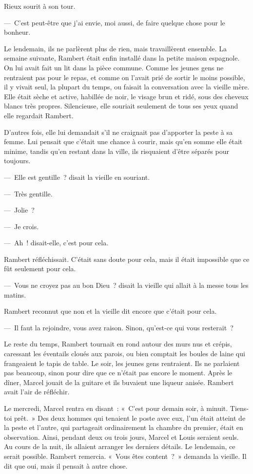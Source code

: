 \documentclass[french,twoside]{book} %
\begin{document}
Rieux sourit à son tour.\par
— C’est peut-être que j’ai envie, moi aussi, de faire quelque chose pour le bonheur.\par
Le lendemain, ils ne parlèrent plus de rien, mais travaillèrent ensemble. La semaine suivante, Rambert était enfin installé dans la petite maison espagnole. On lui avait fait un lit dans la pièce commune. Comme les jeunes gens ne rentraient pas pour le repas, et comme on l’avait prié de sortir le moins possible, il y vivait seul, la plupart du temps, ou faisait la conversation avec la vieille mère. Elle était sèche et active, habillée de noir, le visage brun et ridé, sous des cheveux blancs très propres. Silencieuse, elle souriait seulement de tous ses yeux quand elle regardait Rambert.\par
D’autres fois, elle lui demandait s’il ne craignait pas d’apporter la peste à sa femme. Lui pensait que c’était une chance à courir, mais qu’en somme elle était minime, tandis qu’en restant dans la ville, ils risquaient d’être séparés pour toujours.\par
— Elle est gentille ? disait la vieille en souriant.\par
— Très gentille.\par
— Jolie ?\par
— Je crois.\par
— Ah ! disait-elle, c’est pour cela.\par
Rambert réfléchissait. C’était sans doute pour cela, mais il était impossible que ce fût seulement pour cela.\par
— Vous ne croyez pas au bon Dieu ? disait la vieille qui allait à la messe tous les matins.\par
Rambert reconnut que non et la vieille dit encore que c’était pour cela.\par
— Il faut la rejoindre, vous avez raison. Sinon, qu’est-ce qui vous resterait ?\par
Le reste du temps, Rambert tournait en rond autour des murs nus et crépis, caressant les éventails cloués aux parois, ou bien comptait les boules de laine qui frangeaient le tapis de table. Le soir, les jeunes gens rentraient. Ils ne parlaient pas beaucoup, sinon pour dire que ce n’était pas encore le moment. Après le dîner, Marcel jouait de la guitare et ils buvaient une liqueur anisée. Rambert avait l’air de réfléchir.\par
Le mercredi, Marcel rentra en disant : « C’est pour demain soir, à minuit. Tiens-toi prêt. » Des deux hommes qui tenaient le poste avec eux, l’un était atteint de la peste et l’autre, qui partageait ordinairement la chambre du premier, était en observation. Ainsi, pendant deux ou trois jours, Marcel et Louis seraient seuls. Au cours de la nuit, ils allaient arranger les derniers détails. Le lendemain, ce serait possible. Rambert remercia. « Vous êtes content ? » demanda la vieille. Il dit que oui, mais il pensait à autre chose.\par
\end{document}
